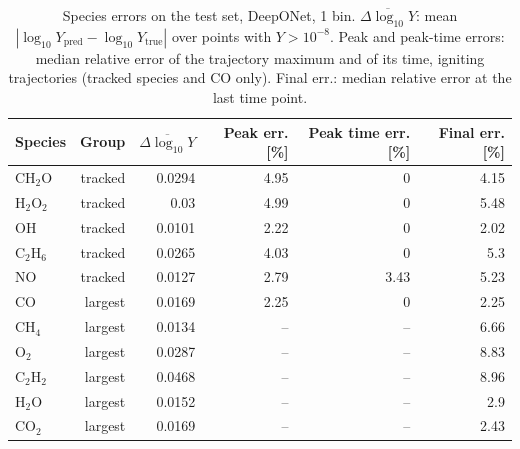 \begin{table}[htbp]
    \centering
    \small
    \begin{tabular}{lrrrrr}
        \hline
        Species & Group & $\overline{\Delta\log_{10}Y}$ & Peak err. [\%] & Peak time err. [\%] & Final err. [\%] \\
        \hline
        $\mathrm{CH_{2}O}$ & tracked & 0.0294 & 4.95 & 0 & 4.15 \\
        $\mathrm{H_{2}O_{2}}$ & tracked & 0.03 & 4.99 & 0 & 5.48 \\
        $\mathrm{OH}$ & tracked & 0.0101 & 2.22 & 0 & 2.02 \\
        $\mathrm{C_{2}H_{6}}$ & tracked & 0.0265 & 4.03 & 0 & 5.3 \\
        $\mathrm{NO}$ & tracked & 0.0127 & 2.79 & 3.43 & 5.23 \\
        $\mathrm{CO}$ & largest & 0.0169 & 2.25 & 0 & 2.25 \\
        $\mathrm{CH_{4}}$ & largest & 0.0134 & -- & -- & 6.66 \\
        $\mathrm{O_{2}}$ & largest & 0.0287 & -- & -- & 8.83 \\
        $\mathrm{C_{2}H_{2}}$ & largest & 0.0468 & -- & -- & 8.96 \\
        $\mathrm{H_{2}O}$ & largest & 0.0152 & -- & -- & 2.9 \\
        $\mathrm{CO_{2}}$ & largest & 0.0169 & -- & -- & 2.43 \\
        \hline
    \end{tabular}
    \caption{Species errors on the test set, DeepONet, 1 bin. $\overline{\Delta\log_{10}Y}$: mean $|\log_{10}Y_\mathrm{pred}-\log_{10}Y_\mathrm{true}|$ over points with $Y>10^{-8}$. Peak and peak-time errors: median relative error of the trajectory maximum and of its time, igniting trajectories (tracked species and CO only). Final err.: median relative error at the last time point.}
    \label{tab:species_deeponet_predicted_b1}
\end{table}
